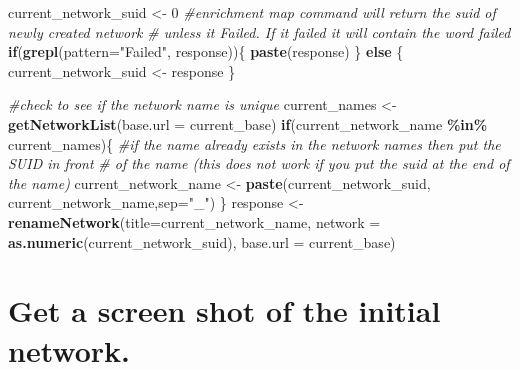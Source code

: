 \documentclass[
]{book}
\newenvironment{Shaded}{\begin{snugshade}}{\end{snugshade}}
\newcommand{\AttributeTok}[1]{\textcolor[rgb]{0.13,0.29,0.53}{#1}}
\newcommand{\CommentTok}[1]{\textcolor[rgb]{0.56,0.35,0.01}{\textit{#1}}}
\newcommand{\ControlFlowTok}[1]{\textcolor[rgb]{0.13,0.29,0.53}{\textbf{#1}}}
\newcommand{\DecValTok}[1]{\textcolor[rgb]{0.00,0.00,0.81}{#1}}
\newcommand{\FunctionTok}[1]{\textcolor[rgb]{0.13,0.29,0.53}{\textbf{#1}}}
\newcommand{\NormalTok}[1]{#1}
\newcommand{\OtherTok}[1]{\textcolor[rgb]{0.56,0.35,0.01}{#1}}
\newcommand{\SpecialCharTok}[1]{\textcolor[rgb]{0.81,0.36,0.00}{\textbf{#1}}}
\newcommand{\StringTok}[1]{\textcolor[rgb]{0.31,0.60,0.02}{#1}}
\begin{document}
\begin{Shaded}
\begin{Highlighting}[]
\NormalTok{current\_network\_suid }\OtherTok{\textless{}{-}} \DecValTok{0}
\CommentTok{\#enrichment map command will return the suid of newly created network }
\CommentTok{\# unless it Failed.  If it failed it will contain the word failed}
\ControlFlowTok{if}\NormalTok{(}\FunctionTok{grepl}\NormalTok{(}\AttributeTok{pattern=}\StringTok{"Failed"}\NormalTok{, response))\{}
  \FunctionTok{paste}\NormalTok{(response)}
\NormalTok{\} }\ControlFlowTok{else}\NormalTok{ \{}
\NormalTok{  current\_network\_suid }\OtherTok{\textless{}{-}}\NormalTok{ response}
\NormalTok{\}}

\CommentTok{\#check to see if the network name is unique}
\NormalTok{current\_names }\OtherTok{\textless{}{-}} \FunctionTok{getNetworkList}\NormalTok{(}\AttributeTok{base.url =}\NormalTok{ current\_base)}
\ControlFlowTok{if}\NormalTok{(current\_network\_name }\SpecialCharTok{\%in\%}\NormalTok{ current\_names)\{}
  \CommentTok{\#if the name already exists in the network names then put the SUID in front}
  \CommentTok{\# of the name (this does not work if you put the suid at the end of the name)}
\NormalTok{  current\_network\_name }\OtherTok{\textless{}{-}} \FunctionTok{paste}\NormalTok{(current\_network\_suid,}
\NormalTok{                                current\_network\_name,}\AttributeTok{sep=}\StringTok{"\_"}\NormalTok{)}
\NormalTok{\}}
\NormalTok{response }\OtherTok{\textless{}{-}} \FunctionTok{renameNetwork}\NormalTok{(}\AttributeTok{title=}\NormalTok{current\_network\_name, }
                       \AttributeTok{network =} \FunctionTok{as.numeric}\NormalTok{(current\_network\_suid),}
                       \AttributeTok{base.url =}\NormalTok{ current\_base)}
\end{Highlighting}
\end{Shaded}

\section{Get a screen shot of the initial network.}\label{get-a-screen-shot-of-the-initial-network.}
\end{document}
